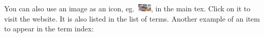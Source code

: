 	You can also use an image as an icon, eg.~\href{http://mei.di.uminho.pt}{\includegraphics[width=0.05\textwidth]{img/mei-logo-03.jpg}}, in the main tex.
	Click on it to visit the website. It is also listed in the list of terms.
	Another example of an item to appear in the term index: %
	
	\fi